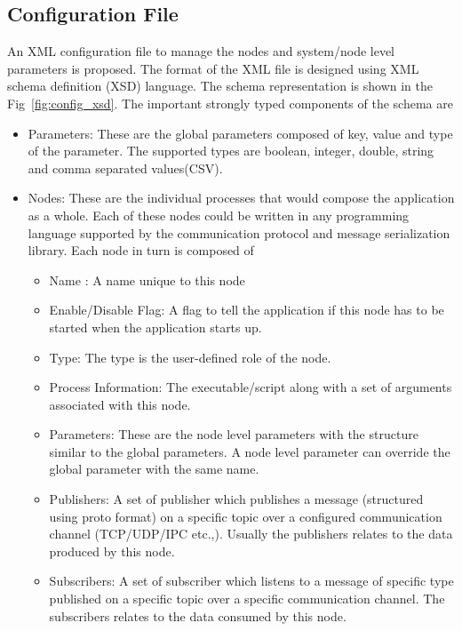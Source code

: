 \subsection{Configuration File}
	An XML configuration file to manage the nodes and system/node level parameters is proposed. The format of the XML file is designed using XML schema definition (XSD) language. The schema representation is shown in the Fig~\ref{fig:config_xsd}. The important strongly typed components of the schema are
	\begin{itemize}
	\item Parameters: These are the global parameters composed of key, value and type of the parameter. The supported types are boolean, integer, double, string and comma separated values(CSV). 
	\item Nodes: These are the individual processes that would compose the application as a whole. Each of these nodes could be written in any programming language supported by the communication protocol and message serialization library. Each node in turn is composed of
	\begin{itemize}
	\item Name : A name unique to this node
	\item Enable/Disable Flag: A flag to tell the application if this node has to be started when the application starts up.
	\item Type: The type is the user-defined role of the node.
	\item Process Information: The executable/script along with a set of arguments associated with this node.
	\item Parameters: These are the node level parameters with the structure similar to the global parameters. A node level parameter can override the global parameter with the same name.
	\item Publishers: A set of publisher which publishes a message (structured using proto format) on a specific topic over a configured communication channel (TCP/UDP/IPC etc.,). Usually the publishers relates to the data produced by this node.
	\item Subscribers: A set of subscriber which listens to a message of specific type published on a specific topic over a specific communication channel. The subscribers relates to the data consumed by this node.
	\end{itemize}
	\end{itemize}
